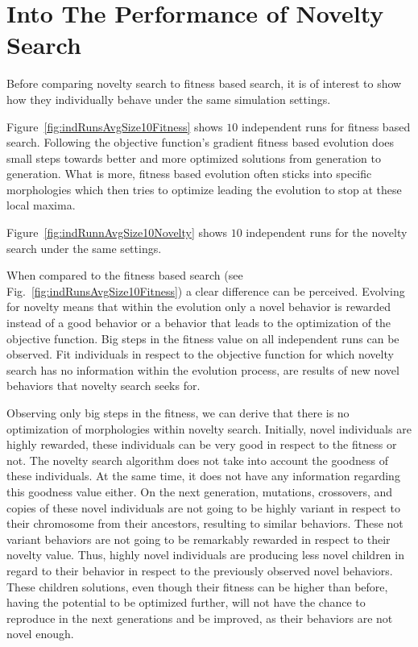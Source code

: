 \section{Into The Performance of Novelty Search}

Before comparing novelty search to fitness based search, it is of interest to show how they individually behave under the same simulation settings.

Figure~\ref{fig:indRunsAvgSize10Fitness} shows $10$ independent runs for fitness based search. Following the objective function's gradient fitness based evolution does small steps towards better and more optimized solutions from generation to generation. What is more, fitness based evolution often sticks into specific morphologies which then tries to optimize leading the evolution to stop at these local maxima.

Figure~\ref{fig:indRunnAvgSize10Novelty} shows $10$ independent runs for the novelty search under the same settings. 

When compared to the fitness based search (see Fig.~\ref{fig:indRunsAvgSize10Fitness}) a clear difference can be perceived. Evolving for novelty means that within the evolution only a novel behavior is rewarded instead of a good behavior or a behavior that leads to the optimization of the objective function. Big steps in the fitness value on all independent runs can be observed. Fit individuals in respect to the objective function for which novelty search has no information within the evolution process, are results of new novel behaviors that novelty search seeks for. 

Observing only big steps in the fitness, we can derive that there is no optimization of morphologies within novelty search. Initially, novel individuals are highly rewarded, these individuals can be very good in respect to the fitness or not. The novelty search algorithm does not take into account the goodness of these individuals. At the same time, it does not have any information regarding this goodness value either. On the next generation, mutations, crossovers, and copies of these novel individuals are not going to be highly variant in respect to their chromosome from their ancestors, resulting to similar behaviors. These not variant behaviors are not going to be remarkably rewarded in respect to their novelty value. Thus, highly novel individuals are producing less novel children in regard to their behavior in respect to the previously observed novel behaviors. These children solutions, even though their fitness can be higher than before, having the potential to be optimized further, will not have the chance to reproduce in the next generations and be improved, as their behaviors are not novel enough. 

